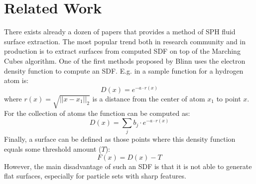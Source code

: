 \chapter{Related Work}\label{sec:related-work}
There exists already a dozen of papers that provides a method of SPH fluid surface extraction. The most popular trend  both in research community and in production is to extract surfaces from computed SDF on top of the Marching Cubes algorithm. One of the first methods proposed by Blinn uses the electron density function to compute an SDF. E.g. in \cite{Blinn} a sample function for a  hydrogen atom is:
\begin{equation}
	D(x) = e^{-a\cdot r(x)}
\end{equation}
where $r(x) = \sqrt{||x - x_1||_2}$ is a distance from the center of atom $x_1$ to point $x$. For the collection of atoms the function can be computed as:
\begin{equation}
	D(x) = \sum_j{b_j\cdot e^{-a\cdot r(x)}}
\end{equation}
Finally, a surface can be defined as those points where this density function equals some threshold amount ($T$):
\begin{equation}
	F(x) = D(x) - T
\end{equation}
However, the main disadvantage of such an SDF is that it is not able to generate flat surfaces, especially for particle sets with sharp features.\\

